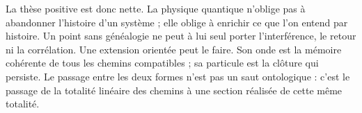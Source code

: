 La thèse positive est donc nette. La physique quantique n'oblige pas à abandonner
l'histoire d'un système ; elle oblige à enrichir ce que l'on entend par histoire. Un point
sans généalogie ne peut à lui seul porter l'interférence, le retour ni la corrélation.
Une extension orientée peut le faire. Son onde est la mémoire cohérente de tous
les chemins compatibles ; sa particule est la clôture qui persiste. Le passage entre
les deux formes n'est pas un saut ontologique : c'est le passage de la totalité linéaire des chemins à
une section réalisée de cette même totalité.
